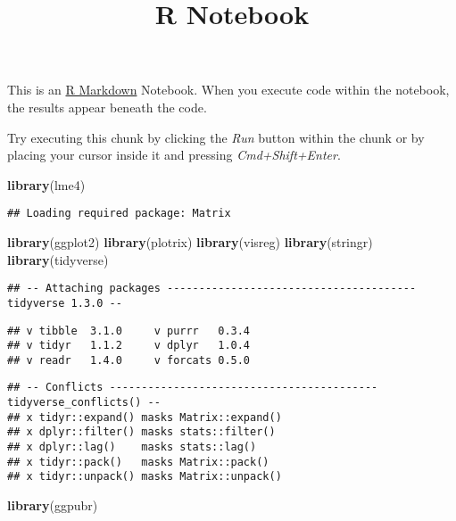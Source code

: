 \documentclass[
]{article}
\title{R Notebook}
\author{}
\date{\vspace{-2.5em}}
\newenvironment{Shaded}{\begin{snugshade}}{\end{snugshade}}
\newcommand{\KeywordTok}[1]{\textcolor[rgb]{0.13,0.29,0.53}{\textbf{#1}}}
\newcommand{\NormalTok}[1]{#1}
\begin{document}
\maketitle

This is an \href{http://rmarkdown.rstudio.com}{R Markdown} Notebook.
When you execute code within the notebook, the results appear beneath
the code.

Try executing this chunk by clicking the \emph{Run} button within the
chunk or by placing your cursor inside it and pressing
\emph{Cmd+Shift+Enter}.

\begin{Shaded}
\begin{Highlighting}[]
\KeywordTok{library}\NormalTok{(lme4)}
\end{Highlighting}
\end{Shaded}

\begin{verbatim}
## Loading required package: Matrix
\end{verbatim}

\begin{Shaded}
\begin{Highlighting}[]
\KeywordTok{library}\NormalTok{(ggplot2)}
\KeywordTok{library}\NormalTok{(plotrix)}
\KeywordTok{library}\NormalTok{(visreg)}
\KeywordTok{library}\NormalTok{(stringr)}
\KeywordTok{library}\NormalTok{(tidyverse)}
\end{Highlighting}
\end{Shaded}

\begin{verbatim}
## -- Attaching packages --------------------------------------- tidyverse 1.3.0 --
\end{verbatim}

\begin{verbatim}
## v tibble  3.1.0     v purrr   0.3.4
## v tidyr   1.1.2     v dplyr   1.0.4
## v readr   1.4.0     v forcats 0.5.0
\end{verbatim}

\begin{verbatim}
## -- Conflicts ------------------------------------------ tidyverse_conflicts() --
## x tidyr::expand() masks Matrix::expand()
## x dplyr::filter() masks stats::filter()
## x dplyr::lag()    masks stats::lag()
## x tidyr::pack()   masks Matrix::pack()
## x tidyr::unpack() masks Matrix::unpack()
\end{verbatim}

\begin{Shaded}
\begin{Highlighting}[]
\KeywordTok{library}\NormalTok{(ggpubr)}
\end{Highlighting}
\end{Shaded}
\end{document}
